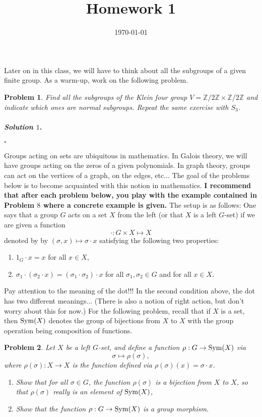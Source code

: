 \documentclass[reqno]{amsart}
\theoremstyle{plain}
\newtheorem{problem}{Problem}
\theoremstyle{definition}
\newenvironment{solution1}{\paragraph{\emph{Solution $1$}.}}{\hfill$\square$}
\begin{document}
 

\title[Homework 1]{Homework 1}

\date{\today} 
\maketitle 

Later on in this class, we will have to think about all the subgroups of a given finite group.  As a warm-up, work on the following problem.
\begin{problem}
Find all the subgroups of the Klein four group $V = \mathbb{Z}/2\mathbb{Z} \times \mathbb{Z}/2\mathbb{Z}$ and indicate which ones are normal subgroups.  Repeat the same exercise with $S_{3}$.
\end{problem}

\begin{solution1}

\end{solution1}

Groups acting on sets are ubiquitous in mathematics.  In Galois theory, we will have groups acting on the zeros of a given polynomials.  In graph theory, groups can act on the vertices of a graph, on the edges, etc...  The goal of the problems below is to become acquainted with this notion in mathematics.  {\bfseries I recommend that after each problem below, you play with the example contained in Problem $8$ where a concrete example is given.}  The setup is as follows:  One says that a group $G$ acts on a set $X$ from the left (or that $X$ is a left $G$-set) if we are given a function 
$$\cdot:G \times X \mapsto X $$
denoted by by $(\sigma,x) \mapsto \sigma \cdot x$ satisfying the following two properties:
\begin{enumerate}[label=(\alph*)]
\item $1_{G} \cdot x = x$ for all $x \in X$,
\item $\sigma_{1} \cdot (\sigma_{2} \cdot x) = (\sigma_{1} \cdot \sigma_{2}) \cdot x$ for all $\sigma_{1}, \sigma_{2} \in G$ and for all $x \in X$.
\end{enumerate}
Pay attention to the meaning of the dot!!!  In the second condition above, the dot has two different meanings... (There is also a notion of right action, but don't worry about this for now.)  For the following problem, recall that if $X$ is a set, then ${\rm Sym}(X)$ denotes the group of bijections from $X$ to $X$ with the group operation being composition of functions.
\begin{problem}
Let $X$ be a left $G$-set, and define a function $\rho:G \rightarrow {\rm Sym}(X)$ via
$$\sigma \mapsto \rho(\sigma), $$
where $\rho(\sigma):X \rightarrow X$ is the function defined via $\rho(\sigma)(x) = \sigma \cdot x$.
\begin{enumerate}[label=(\alph*)]
\item Show that for all $\sigma \in G$, the function $\rho(\sigma)$ is a bijection from $X$ to $X$, so that $\rho(\sigma)$ really is an element of ${\rm Sym}(X)$,
\item Show that the function $\rho:G \rightarrow {\rm Sym}(X)$ is a group morphism.
\end{enumerate}
\end{problem}
\end{document}
